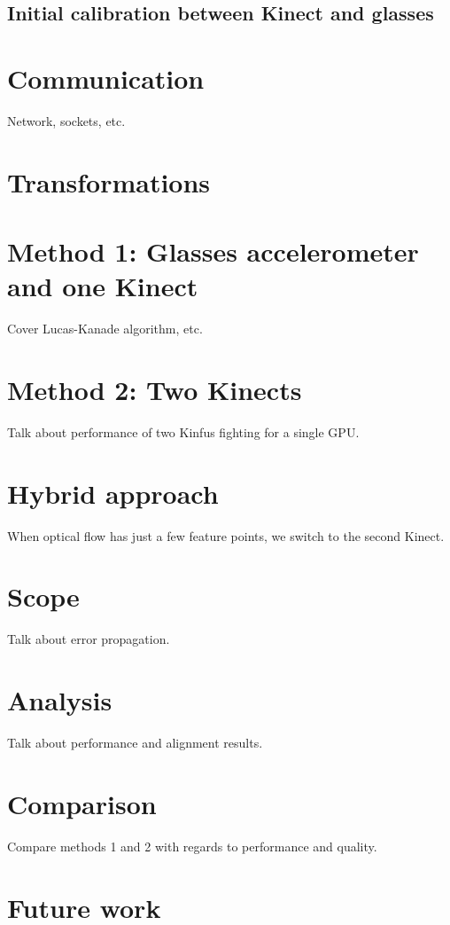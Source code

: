\documentclass[msc, a4paper, classic, en]{ufbathesis}
\begin{document}
\subsection{Initial calibration between Kinect and glasses}
\section{Communication}
\label{sec:comm}
Network, sockets, etc.
\section{Transformations}
\section{Method 1: Glasses accelerometer and one Kinect}
\label{sec:method1}
Cover Lucas-Kanade algorithm, etc.
\section{Method 2: Two Kinects}
\label{sec:method2}
Talk about performance of two Kinfus fighting for a single GPU.
\section{Hybrid approach}
When optical flow has just a few feature points, we switch to the second Kinect.

\label{sec:results}
\section{Scope}
Talk about error propagation.
\section{Analysis}
Talk about performance and alignment results.
\section{Comparison}
Compare methods 1 and 2 with regards to performance and quality.

\section{Future work}
\end{document}
